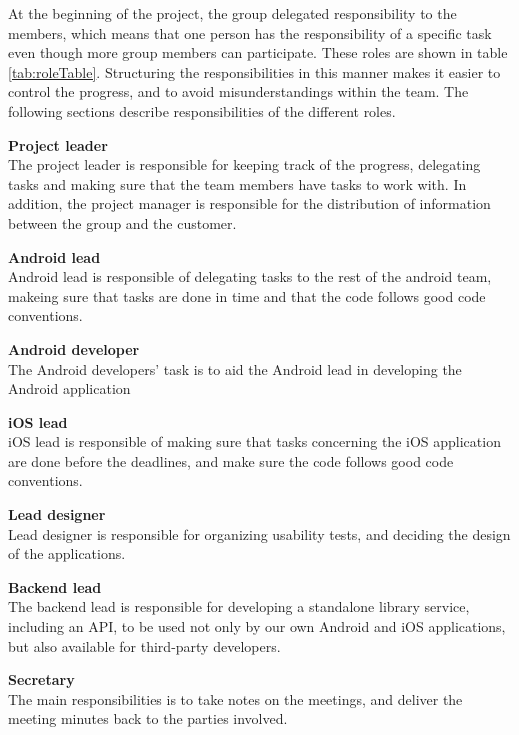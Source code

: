 At the beginning of the project, the group delegated responsibility to the members, which means that one person has the responsibility of a specific task even though more group members can participate. These roles are shown in table \ref{tab:roleTable}. Structuring the responsibilities in this manner makes it easier to control the progress, and to avoid misunderstandings within the team. The following sections describe responsibilities of the different roles. 
\begin{description}
    \item{\textbf{Project leader}} \\
        The project leader is responsible for keeping track of the progress, delegating tasks and making sure that the team members have tasks to work with. In addition, the project manager is responsible for the distribution of information between the group and the customer. 
    \item{\textbf{Android lead}} \\
        Android lead is responsible of delegating tasks to the rest of the android team, makeing sure that tasks are done in time and that the code follows good code conventions.
    \item{\textbf{Android developer}} \\
        The Android developers' task is to aid the Android lead in developing the Android application
    \item{\textbf{iOS lead}} \\
        iOS lead is responsible of making sure that tasks concerning the iOS application are done before the deadlines, and make sure the code follows good code conventions.
    \item{\textbf{Lead designer}} \\
        Lead designer is responsible for organizing usability tests, and deciding the design of the applications.
    \item{\textbf{Backend lead}} \\
        The backend lead is responsible for developing a standalone library service, including an API, to be used not only by our own Android and iOS applications, but also available for third-party developers. 
    \item{\textbf{Secretary}} \\
        The main responsibilities is to take notes on the meetings, and deliver the meeting minutes back to the parties involved.
\end{description} 

